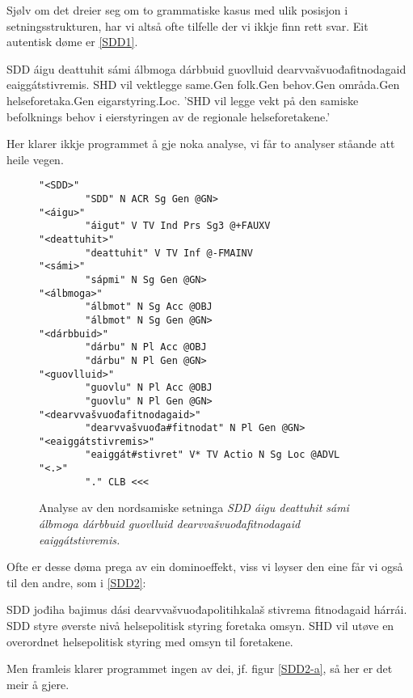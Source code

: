 \documentclass[a4paper,norsk]{article}
\begin{document}
Sjølv om det dreier seg om to grammatiske kasus med ulik posisjon i setningsstrukturen, har vi altså ofte tilfelle der vi ikkje finn rett svar. Eit autentisk døme er \ref{SDD1}. %

 \begin{example}\label{SDD1}
\gll SDD áigu deattuhit sámi álbmoga dárbbuid guovlluid dearvvašvuođafitnodagaid eaiggátstivremis.
      SHD vil vektlegge same.Gen folk.Gen behov.Gen områda.Gen helseforetaka.Gen eigarstyring.Loc.
\glt  'SHD vil legge vekt på den samiske befolknings behov i eierstyringen av de regionale helseforetakene.'
\glend
\end{example}

Her klarer ikkje programmet å gje noka analyse, vi får to analyser ståande att heile vegen. %

\begin{figure}[htbp]
\begin{center}
\begin{verbatim}
"<SDD>"
        "SDD" N ACR Sg Gen @GN>
"<áigu>"
        "áigut" V TV Ind Prs Sg3 @+FAUXV
"<deattuhit>"
        "deattuhit" V TV Inf @-FMAINV
"<sámi>"
        "sápmi" N Sg Gen @GN>
"<álbmoga>"
        "álbmot" N Sg Acc @OBJ
        "álbmot" N Sg Gen @GN>
"<dárbbuid>"
        "dárbu" N Pl Acc @OBJ
        "dárbu" N Pl Gen @GN>
"<guovlluid>"
        "guovlu" N Pl Acc @OBJ
        "guovlu" N Pl Gen @GN>
"<dearvvašvuođafitnodagaid>"
        "dearvvašvuođa#fitnodat" N Pl Gen @GN>
"<eaiggátstivremis>"
        "eaiggát#stivret" V* TV Actio N Sg Loc @ADVL
"<.>"
        "." CLB <<<
\end{verbatim}
\caption{Analyse av den nordsamiske setninga \textit{SDD áigu deattuhit sámi álbmoga dárbbuid guovlluid dearvvašvuođafitnodagaid eaiggátstivremis.}}
\label{SDD1-a}
\end{center}
\end{figure}


Ofte er desse døma prega av ein dominoeffekt, viss vi løyser den eine får vi også til den andre, som i \ref{SDD2}: %

\begin{example}\label{SDD2}
\gll SDD jođiha bajimus dási dearvvašvuođapolitihkalaš stivrema fitnodagaid hárrái.
      SDD styre øverste nivå helsepolitisk styring foretaka omsyn.
\glt      SHD vil utøve en overordnet helsepolitisk styring med omsyn til foretakene.
\glend
\end{example}

Men framleis klarer programmet ingen av dei, jf. figur \ref{SDD2-a}, så her er det meir å gjere. %
\end{document}
